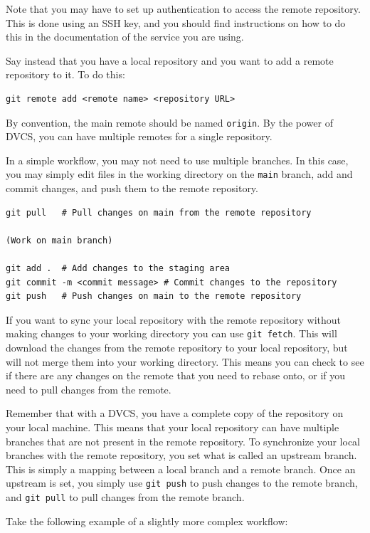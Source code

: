 \documentclass[fleqn]{article}
\begin{document}
Note that you may have to set up authentication to access the remote repository.
This is done using an SSH key, and you should find instructions on how to do
this in the documentation of the service you are using.

Say instead that you have a local repository and you want to add a remote
repository to it. To do this:

\begin{lstlisting}
git remote add <remote name> <repository URL>
\end{lstlisting}

By convention, the main remote should be named \texttt{origin}. By the power of
DVCS, you can have multiple remotes for a single repository.

In a simple workflow, you may not need to use multiple branches. In this case,
you may simply edit files in the working directory on the \texttt{main} branch,
add and commit changes, and push them to the remote repository.

\begin{lstlisting}
git pull   # Pull changes on main from the remote repository

(Work on main branch)

git add .  # Add changes to the staging area
git commit -m <commit message> # Commit changes to the repository
git push   # Push changes on main to the remote repository
\end{lstlisting}

If you want to sync your local repository with the remote repository without
making changes to your working directory you can use \texttt{git fetch}. This
will download the changes from the remote repository to your local repository,
but will not merge them into your working directory. This means you can check
to see if there are any changes on the remote that you need to rebase onto, or
if you need to pull changes from the remote.

Remember that with a DVCS, you have a complete copy of the repository on your
local machine. This means that your local repository can have multiple branches
that are not present in the remote repository. To synchronize your local
branches with the remote repository, you set what is called an upstream branch.
This is simply a mapping between a local branch and a remote branch. Once an
upstream is set, you simply use \texttt{git push} to push changes to the remote
branch, and \texttt{git pull} to pull changes from the remote branch.

Take the following example of a slightly more complex workflow:
\end{document}
